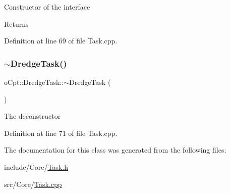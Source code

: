 Constructor of the interface \begin{DoxyReturn}{Returns}

\end{DoxyReturn}


Definition at line 69 of file Task.\+cpp.

\hypertarget{classo_cpt_1_1_dredge_task_aa326cf6ddbb6e3019fb86f8d714bf323}{}\label{classo_cpt_1_1_dredge_task_aa326cf6ddbb6e3019fb86f8d714bf323} 
\subsubsection{\texorpdfstring{$\sim$\+Dredge\+Task()}{~DredgeTask()}}
{\footnotesize\ttfamily o\+Cpt\+::\+Dredge\+Task\+::$\sim$\+Dredge\+Task (\begin{DoxyParamCaption}{ }\end{DoxyParamCaption})\hspace{0.3cm}{\ttfamily [virtual]}}

The deconstructor 

Definition at line 71 of file Task.\+cpp.



The documentation for this class was generated from the following files\+:\begin{DoxyCompactItemize}
\item 
include/\+Core/\hyperlink{_task_8h}{Task.\+h}\item 
src/\+Core/\hyperlink{_task_8cpp}{Task.\+cpp}\end{DoxyCompactItemize}
